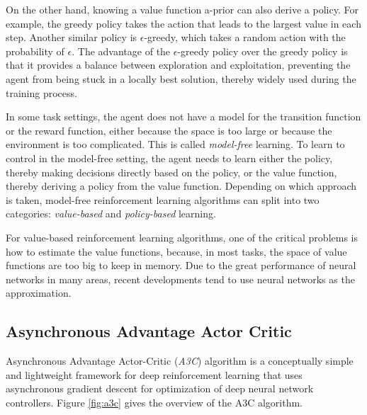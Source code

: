         On the other hand, knowing a value function a-prior can also derive a policy.
        For example, the greedy policy takes the action that leads to the largest value in each step.
        Another similar policy is $\epsilon$-greedy,
        which takes a random action with the probability of $\epsilon$.
        The advantage of the $\epsilon$-greedy policy over the greedy policy is that
        it provides a balance between exploration and exploitation,
        preventing the agent from being stuck in a locally best solution,
        thereby widely used during the training process.

        In some task settings,
        the agent does not have a model for the transition function or the reward function,
        either because the space is too large or because the environment is too complicated.
        This is called \emph{model-free} learning.
        To learn to control in the model-free setting, the agent needs to learn either
        the policy, thereby making decisions directly based on the policy,
        or the value function, thereby deriving a policy from the value function.
        Depending on which approach is taken,
        model-free reinforcement learning algorithms can split into two categories:
        \emph{value-based} and \emph{policy-based} learning.

        For value-based reinforcement learning algorithms,
        one of the critical problems is how to estimate the value functions,
        because, in most tasks, the space of value functions are too big to keep in memory.
        Due to the great performance of neural networks in many areas,
        recent developments tend to use neural networks as the approximation.

    \subsection{Asynchronous Advantage Actor Critic}

        Asynchronous Advantage Actor-Critic \cite{mnih_asynchronous_2016} (\emph{A3C}) algorithm is
        a conceptually simple and lightweight framework for deep reinforcement learning
        that uses asynchronous gradient descent for optimization of deep neural network controllers.
        Figure \ref{fig:a3c} gives the overview of the A3C algorithm.

